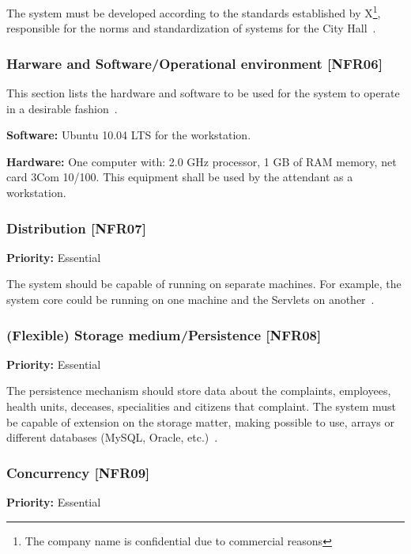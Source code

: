 \documentclass[11pt,twoside]{article}
\begin{document}
The system must be developed according to the standards established by X\footnote{The company name is confidential due to commercial
reasons}, responsible for the norms and standardization of systems for
the City Hall~\cite{hw-usecase,hw-alignment}.


\subsubsection{Harware and Software/Operational environment [NFR06]}

This section lists the hardware and software to be used for the system to operate in a desirable fashion~\cite{hw-usecase}.

\textbf{Software:} Ubuntu 10.04 LTS for the workstation.

\textbf{Hardware:} One computer with: 2.0 GHz processor, 1 GB of RAM memory, net card 3Com 10/100. This equipment shall be used by
the attendant as a workstation.


\subsubsection{Distribution [NFR07]}

\textbf{Priority:} Essential

The system should be capable of running on separate machines. For example, the system core could be running on one machine and the Servlets
on another~\cite{hw-usecase}.



\subsubsection{(Flexible) Storage medium/Persistence [NFR08]}

\textbf{Priority:} Essential


The persistence mechanism should store data about the complaints, employees, health units, deceases, specialities
and citizens that complaint. The system must be capable of extension on the storage matter, making possible to use, arrays
or different databases (MySQL, Oracle, etc.)~\cite{hw-aore,hw-usecase}.





\subsubsection{Concurrency [NFR09]}
\textbf{Priority:} Essential
\end{document}
